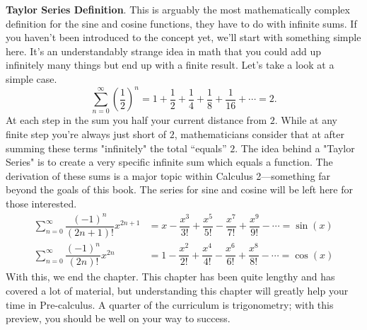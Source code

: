 \documentclass[lang=en,11pt]{elegantbook}
\begin{document}
\textbf{Taylor Series Definition}.  This is arguably the most mathematically complex definition for the sine and cosine functions, they have to do with infinite sums. If you haven’t been introduced to the concept yet, we’ll start with something simple here. It’s an understandably strange idea in math that you could add up infinitely many things but end up with a finite result. Let’s take a look at a simple case. $$\sum_{n=0}^{\infty}{\left(\dfrac{1}{2}\right)^n}=1+\dfrac{1}{2}+\dfrac{1}{4}+\dfrac{1}{8}+\dfrac{1}{16}+\cdots=2.$$
At each step in the sum you half your current distance from $2$. While at any finite step you’re always just short of $2$, mathematicians consider that at after summing these terms "infinitely" the total “equals” $2$. The idea behind a "Taylor Series" is to create a very specific infinite sum which equals a function. The derivation of these sums is a major topic within Calculus 2—something far beyond the goals of this book. The series for sine and cosine will be left here for those interested.
\begin{align*}
    \sum_{n=0}^{\infty}{\dfrac{(-1)^n}{(2n+1)!}x^{2n+1}}&=x-\dfrac{x^3}{3!}+\dfrac{x^5}{5!}-\dfrac{x^7}{7!}+\dfrac{x^9}{9!}-\cdots=\sin(x) \\
    \sum_{n=0}^{\infty}{\dfrac{(-1)^n}{(2n)!}x^{2n}}&=1-\dfrac{x^2}{2!}+\dfrac{x^4}{4!}-\dfrac{x^6}{6!}+\dfrac{x^8}{8!}-\cdots=\cos(x)    
\end{align*}
With this, we end the chapter.  This chapter has been quite lengthy and has covered a lot of material, but understanding this chapter will greatly help your time in Pre-calculus.  A quarter of the curriculum is trigonometry; with this preview, you should be well on your way to success.
\end{document}
